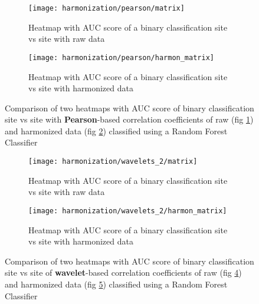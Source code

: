 \documentclass[11pt]{report}
\begin{document}
\begin{figure}
\centering
\begin{subfigure}[b]{0.7\textwidth}
   \texttt{[image: harmonization/pearson/matrix]}
   \caption{Heatmap with AUC score of a binary classification site vs site with raw data}
   \label{fig:heatmap_harmonization_noharmon}
\end{subfigure}

\begin{subfigure}[b]{0.7\textwidth}
   \texttt{[image: harmonization/pearson/harmon\_matrix]}
   \caption{Heatmap with AUC score of a binary classification site vs site with harmonized data}
   \label{fig:heatmap_harmonization_harmon}
\end{subfigure}

\caption{Comparison of two heatmaps with AUC score of binary classification site vs site with \textbf{Pearson}-based correlation coefficients of raw (fig \ref{fig:heatmap_harmonization_noharmon}) and harmonized data (fig \ref{fig:heatmap_harmonization_harmon}) classified using a Random Forest Classifier
}
\label{fig:heatmap_harmonization}
\end{figure}



\begin{figure}
\centering
\begin{subfigure}[b]{0.70\textwidth}
   \texttt{[image: harmonization/wavelets\_2/matrix]}
   \caption{Heatmap with AUC score of a binary classification site vs site with raw data}
   \label{fig:heatmap_harmonization_noharmon_w}
\end{subfigure}

\begin{subfigure}[b]{0.70\textwidth}
   \texttt{[image: harmonization/wavelets\_2/harmon\_matrix]}
   \caption{Heatmap with AUC score of a binary classification site vs site with harmonized data}
   \label{fig:heatmap_harmonization_harmon_w}
\end{subfigure}

\caption{Comparison of two heatmaps with AUC score of binary classification site vs site of \textbf{wavelet}-based correlation coefficients of raw (fig \ref{fig:heatmap_harmonization_noharmon_w}) and harmonized data (fig \ref{fig:heatmap_harmonization_harmon_w}) classified using a Random Forest Classifier
}
\label{fig:heatmap_harmonization_w}
\end{figure}
\end{document}
